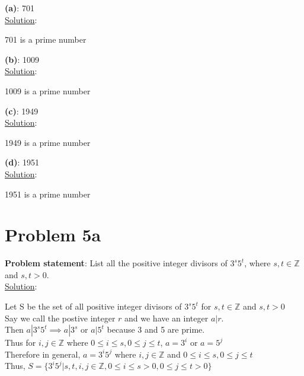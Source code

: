 \documentclass{article} %
\begin{document}
\begin{addmargin}[1em]{0em}

\textbf{(a)}: 701
\\ \hfill \break
\underline{Solution}: 
\begin{addmargin}[1em]{0em}
701 is a prime number
\end{addmargin}
\hfill \break

\textbf{(b)}: 1009
\\ \hfill \break
\underline{Solution}: 
\begin{addmargin}[1em]{0em}
1009 is a prime number
\end{addmargin}
\hfill \break

\textbf{(c)}: 1949
\\ \hfill \break
\underline{Solution}: 
\begin{addmargin}[1em]{0em}
1949 is a prime number
\end{addmargin}
\hfill \break

\textbf{(d)}: 1951
\\ \hfill \break
\underline{Solution}: 
\begin{addmargin}[1em]{0em}
1951 is a prime number
\end{addmargin}
\end{addmargin}

\newpage

\section*{Problem 5a}


\textbf{Problem statement}: List all the positive integer divisors of $3^s5^t$, where $s, t \in \mathbb{Z}$ and $s, t > 0$.
\\

\underline{Solution}: 
\begin{addmargin}[1em]{0em}
Let S be the set of all positive integer divisors of $3^s5^t$ for $s, t \in \mathbb{Z}$ and $s, t > 0$
\\Say we call the postive integer $r$ and we have an integer $a|r$.
\\Then $a|3^s5^t \implies a|3^s$ or $a|5^t$ because 3 and 5 are prime.
\\Thus for $i, j \in \mathbb{Z}$ where $0 \leq i \leq s, 0 \leq j \leq t$, $a = 3^{i}$ or $a = 5^{j}$
\\Therefore in general, $a = 3^i5^j$ where $i, j \in \mathbb{Z}$ and $0 \leq i \leq s, 0 \leq j \leq t$
\\Thus, $S = \{3^i5^j | s, t, i, j \in \mathbb{Z}, 0 \leq i \leq s > 0, 0 \leq j \leq t > 0\}$
\end{addmargin}
\end{document}
